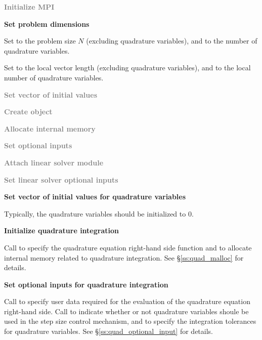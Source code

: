 \begin{Steps}
  
\item 
  \textcolor{gray}{\bf {\p} Initialize MPI}

\item
  {\bf Set problem dimensions}

  {\s} Set  to the problem size $N$ (excluding quadrature variables),
  and  to the number of quadrature variables.

  {\p} Set  to the local vector length (excluding quadrature variables),
  and  to the local number of quadrature variables.
  
\item
  \textcolor{gray}{\bf Set vector of initial values}
 
\item\label{i:quad_cvode_create}
  \textcolor{gray}{\bf Create {\cvodes} object}

\item
  \textcolor{gray}{\bf Allocate internal memory}

\item
  \textcolor{gray}{\bf Set optional inputs}

\item
  \textcolor{gray}{\bf Attach linear solver module}

\item
  \textcolor{gray}{\bf Set linear solver optional inputs}

\item
  {\bf Set vector of initial values for quadrature variables}

  Typically, the quadrature variables should be initialized to $0$.

\item
  {\bf Initialize quadrature integration}

  Call  to specify the quadrature equation right-hand
  side function and to allocate internal memory related to quadrature integration. 
  See \S\ref{ss:quad_malloc} for details.

\item\label{i:quad_optional_inputs}
  {\bf Set optional inputs for quadrature integration}

  Call  to specify user data required for the evaluation
  of the quadrature equation right-hand side.
  Call  to indicate whether or not quadrature variables
  shoule be used in the step size control mechanism, and to specify the integration 
  tolerances for quadrature variables.
  See \S\ref{ss:quad_optional_input} for details.


\end{Steps}
